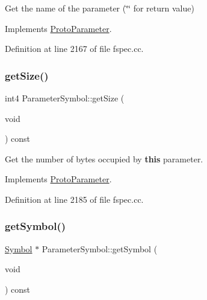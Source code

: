 Get the name of the parameter (\char`\"{}\char`\"{} for return value) 



Implements \mbox{\hyperlink{class_proto_parameter_a03d8c36596d1564b5366295ff63fc182}{Proto\+Parameter}}.



Definition at line 2167 of file fspec.\+cc.

\mbox{\label{class_parameter_symbol_a3b5d9b9aabab788511f43446745048c9}} 
\subsubsection{\texorpdfstring{getSize()}{getSize()}}
{\footnotesize\ttfamily int4 Parameter\+Symbol\+::get\+Size (\begin{DoxyParamCaption}\item[{void}]{ }\end{DoxyParamCaption}) const\hspace{0.3cm}{\ttfamily [virtual]}}



Get the number of bytes occupied by {\bfseries{this}} parameter. 



Implements \mbox{\hyperlink{class_proto_parameter_a910cfb9ed6ce57e9bf6e9789b8ed3e0f}{Proto\+Parameter}}.



Definition at line 2185 of file fspec.\+cc.

\mbox{\label{class_parameter_symbol_a4ad5640e944e78b0e02679503ee27534}} 
\subsubsection{\texorpdfstring{getSymbol()}{getSymbol()}}
{\footnotesize\ttfamily \mbox{\hyperlink{class_symbol}{Symbol}} $\ast$ Parameter\+Symbol\+::get\+Symbol (\begin{DoxyParamCaption}\item[{void}]{ }\end{DoxyParamCaption}) const\hspace{0.3cm}{\ttfamily [virtual]}}



